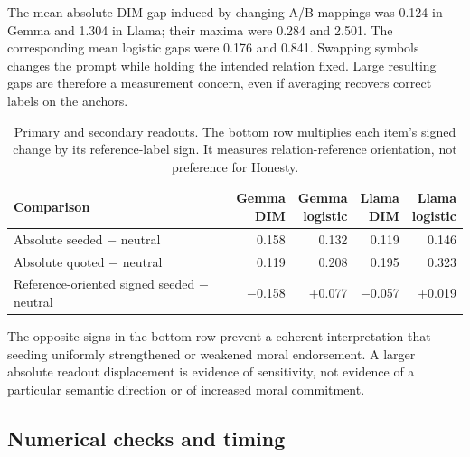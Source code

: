 The mean absolute DIM gap induced by changing A/B mappings was 0.124 in Gemma and 1.304 in Llama; their maxima were 0.284 and 2.501. The corresponding mean logistic gaps were 0.176 and 0.841. Swapping symbols changes the prompt while holding the intended relation fixed. Large resulting gaps are therefore a measurement concern, even if averaging recovers correct labels on the anchors.

\begin{table}[t]
\caption{Primary and secondary readouts. The bottom row multiplies each item's signed change by its reference-label sign. It measures relation-reference orientation, not preference for Honesty.}
\label{tab:3}
\small
\setlength{\tabcolsep}{4pt}
\begin{tabularx}{\linewidth}{@{}Xrrrr@{}}
\toprule
\textbf{Comparison} & \makecell[r]{Gemma\\ DIM} & \makecell[r]{Gemma\\ logistic} & \makecell[r]{Llama\\ DIM} & \makecell[r]{Llama\\ logistic} \\
\midrule
Absolute seeded \ensuremath{-} neutral & 0.158 & 0.132 & 0.119 & 0.146 \\
Absolute quoted \ensuremath{-} neutral & 0.119 & 0.208 & 0.195 & 0.323 \\
Reference-oriented signed seeded \ensuremath{-} neutral & \ensuremath{-}0.158 & +0.077 & \ensuremath{-}0.057 & +0.019 \\
\bottomrule
\end{tabularx}
\end{table}

The opposite signs in the bottom row prevent a coherent interpretation that seeding uniformly strengthened or weakened moral endorsement. A larger absolute readout displacement is evidence of sensitivity, not evidence of a particular semantic direction or of increased moral commitment.

\subsection{Numerical checks and timing}\label{numerical-checks-and-timing}

